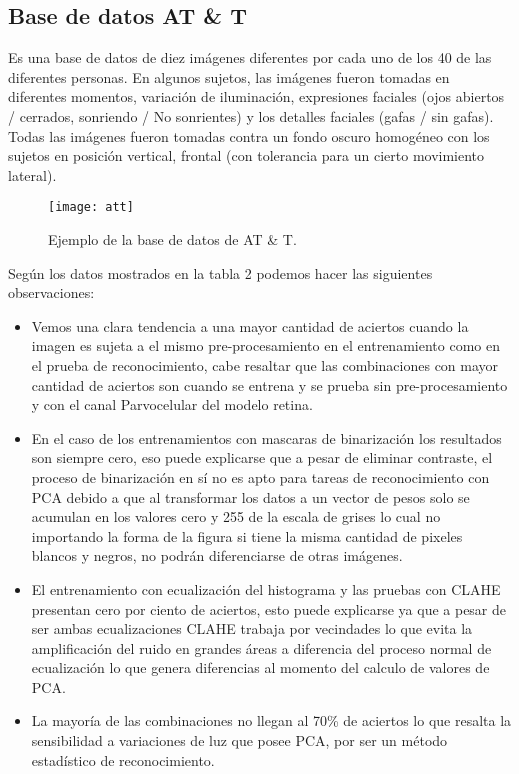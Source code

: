 \subsection{Base de datos AT \& T}
Es una base de datos de diez imágenes diferentes por cada uno de los 40 de las diferentes personas. En algunos sujetos, las imágenes fueron tomadas en diferentes momentos, variación de iluminación, expresiones faciales (ojos abiertos / cerrados, sonriendo / No sonrientes) y los detalles faciales (gafas / sin gafas). Todas las imágenes fueron tomadas contra un fondo oscuro homogéneo con los sujetos en posición vertical, frontal (con tolerancia para un cierto movimiento lateral).
\begin{figure}[h]
    \center
    \texttt{[image: att]}
    \caption{Ejemplo de la base de datos de AT \& T.}
\end{figure}
Según los datos mostrados en la tabla 2 podemos hacer las siguientes observaciones:
\begin{itemize}
\item Vemos una clara tendencia a una mayor cantidad de aciertos cuando la imagen es sujeta a el mismo pre-procesamiento en el entrenamiento como en el  prueba de reconocimiento, cabe resaltar que las combinaciones con mayor cantidad de aciertos son cuando se entrena y se prueba sin pre-procesamiento y con el canal Parvocelular del modelo retina.
\item En el caso de los entrenamientos con mascaras de binarización los resultados son siempre cero, eso puede explicarse que a pesar de eliminar contraste, el proceso de binarización en sí no es apto para tareas de reconocimiento con \ac{PCA} debido a que al transformar los datos a un vector de pesos solo se acumulan en los valores cero y 255 de la escala de grises lo cual no importando la forma de la figura si tiene la misma cantidad de pixeles blancos y negros, no podrán diferenciarse de otras imágenes.
\item El entrenamiento con ecualización del histograma y las pruebas con \ac{CLAHE} presentan cero por ciento de aciertos, esto puede explicarse ya que a pesar de ser ambas ecualizaciones \ac{CLAHE} trabaja por vecindades lo que evita la amplificación del ruido en grandes áreas a diferencia del proceso normal de ecualización lo que genera diferencias al momento del calculo de valores de \ac{PCA}.
\item La mayoría de las combinaciones no llegan al 70\% de aciertos lo que resalta la sensibilidad a variaciones de luz que posee \ac{PCA}, por ser un método estadístico de reconocimiento.
\end{itemize}
